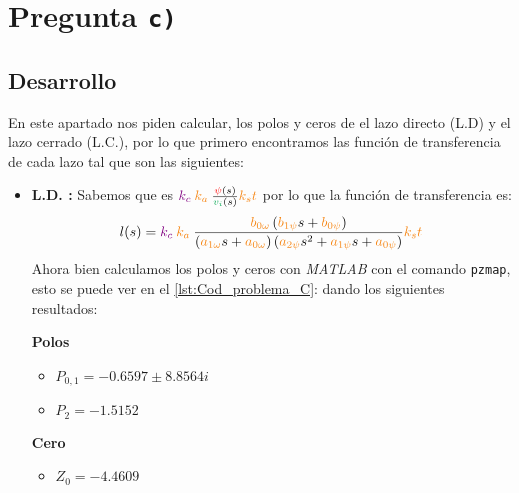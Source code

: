 \section{Pregunta \texttt{c)}}\label{pregunta-c}
\subsection{Desarrollo}

En este apartado nos piden calcular, los polos y ceros de el lazo directo (L.D) 
y el lazo cerrado (L.C.), por lo que primero encontramos las función de 
transferencia de cada lazo tal que son las siguientes:

\begin{itemize}


    \item \textbf{L.D. :} Sabemos que es \( \mora{k_c} \nara{ k_a} \frac{\rojo{\psi}(s)}{\verd{v_i}(s)}\nara{k_st} \) por lo que la función de transferencia es:
    \begin{equation}
        l(s)= \mora{k_c} \nara{k_a} \frac{\nara{\nara{b_{0\omega}}}\left(\nara{b_{1\psi}}s + \nara{b_{0\psi}}\right)}
        {\left(\nara{a_{1\omega}}s + \nara{a_{0\omega}}\right)\left(\nara{a_{2\psi}}s^{2} + \nara{a_{1\psi}}s + \nara{a_{0\psi}}\right)} \nara{k_st}
    \end{equation}
    Ahora bien calculamos los polos y ceros con \textit{MATLAB} con el comando \verb|pzmap|, esto se puede ver en el \autoref{lst:Cod_problema_C}: dando los siguientes resultados:

\begin{multicols}{2}
    \textbf{Polos}
    \begin{itemize}
        \item \(P_{0,1} = -0.6597 \pm 8.8564i\) 
        \item \(P_2 = -1.5152 \)
    \end{itemize}
    \columnbreak
    \textbf{Cero}
    \begin{itemize}
        \item \(Z_0 = -4.4609\)
    \end{itemize}
  \end{multicols}


\end{itemize}
